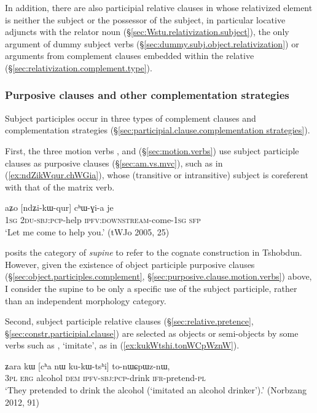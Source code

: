 In addition, there are also participial relative clauses in  whose relativized element is neither the subject or the possessor of the subject, in particular locative adjuncts with the relator noun  (§\ref{sec:Wstu.relativization.subject}), the only argument of dummy subject verbs (§\ref{sec:dummy.subj.object.relativization}) or arguments from complement clauses embedded within the relative (§\ref{sec:relativization.complement.type}).

  \subsubsection{Purposive clauses and other complementation strategies}  \label{sec:subject.participle.complementation}
Subject participles occur in three types of complement clauses and complementation strategies (§\ref{sec:participial.clause.complementation strategies}). 

First, the three motion verbs ,  and   (§\ref{sec:motion.verbs}) use subject participle clauses as purposive clauses (§\ref{sec:am.vs.mvc}), such as  in (\ref{ex:ndZikWqur.chWGia}), whose (transitive or intransitive) subject is coreferent with that of the matrix verb.

\begin{exe}
\ex \label{ex:ndZikWqur.chWGia}
\gll aʑo [ndʑi-kɯ-qur] cʰɯ-ɣi-a je \\
\textsc{1sg} \textsc{2du}-\textsc{sbj}:\textsc{pcp}-help \textsc{ipfv}:\textsc{downstream}-come-\textsc{1sg} \textsc{sfp} \\
\glt `Let me come to help you.' (tWJo 2005, 25)
\end{exe} 

\citet{sun12complementation} posits the category of \textit{supine} to refer to the cognate construction in Tshobdun. However, given the existence of object participle purposive clauses (§\ref{sec:object.participles.complement}, §\ref{sec:purposive.clause.motion.verbs}) above, I consider the supine to be only a specific use of the subject participle, rather than an independent morphology category.

Second,  subject participle relative clauses (§\ref{sec:relative.pretence}, §\ref{sec:constr.participial.clause}) are selected as objects or semi-objects by some verbs such as , `imitate', as in  (\ref{ex:kukWtshi.tonWCpWznW}).

\begin{exe}
\ex \label{ex:kukWtshi.tonWCpWznW}
 \gll  ʑara kɯ [cʰa nɯ ku-kɯ-tsʰi] to-nɯɕpɯz-nɯ, \\
\textsc{3pl} \textsc{erg} alcohol \textsc{dem} \textsc{ipfv}-\textsc{sbj}:\textsc{pcp}-drink \textsc{ifr}-pretend-\textsc{pl} \\
\glt  `They pretended to drink the alcohol (`imitated an alcohol drinker').'  (Norbzang 2012, 91)
\end{exe}


